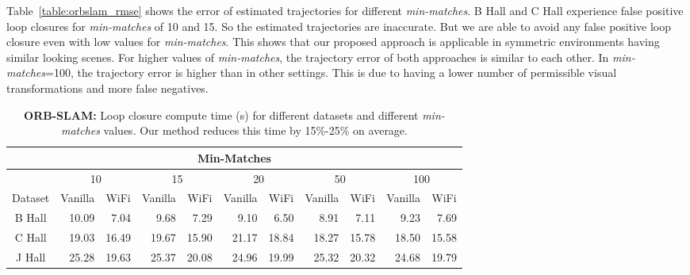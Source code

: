 Table~\ref{table:orbslam_rmse} shows the error of estimated trajectories for different {\it min-matches}. 
B Hall and C Hall experience false positive loop closures for {\it min-matches} of 10 and 15. 
So the estimated trajectories are inaccurate.
But we are able to avoid any false positive loop closure even with low values for {\it min-matches}. 
This shows that our proposed approach is applicable in symmetric environments having similar looking scenes. 
For higher values of {\it min-matches}, the trajectory error of both approaches is similar to each other.
In {\it min-matches}=100, the trajectory error is higher than in other settings. This is due to having a lower number of permissible visual transformations and more false negatives.
\begin{table}
\caption{{\bf ORB-SLAM:} Loop closure compute time (s) for different datasets and different {\it min-matches} values. Our method reduces this time by 15\%-25\% on average. }
\begin{center}
\begin{tabular}{| c | r r | r r | r r | r r | r r |} 
\hline 
\multicolumn{11}{|c|}{{Min-Matches}} \\ 
\hline 
 & \multicolumn{2}{|c|}{10} & \multicolumn{2}{|c|}{15} & \multicolumn{2}{|c|}{20} & \multicolumn{2}{|c|}{50} & \multicolumn{2}{|c|}{100} \\ 
\hline 
 {Dataset} & \multicolumn{1}{|c|}{Vanilla} & \multicolumn{1}{|c|}{WiFi} & \multicolumn{1}{|c|}{Vanilla} & \multicolumn{1}{|c|}{WiFi} & \multicolumn{1}{|c|}{Vanilla} & \multicolumn{1}{|c|}{WiFi} & \multicolumn{1}{|c|}{Vanilla} & \multicolumn{1}{|c|}{WiFi} & \multicolumn{1}{|c|}{Vanilla} & \multicolumn{1}{|c|}{WiFi} \\ 
\hline 
 B Hall & 10.09 & 7.04 & 9.68 & 7.29 & 9.10 & 6.50 & 8.91 & 7.11 & 9.23 & 7.69 \\ 
 C Hall & 19.03 & 16.49 & 19.67 & 15.90 & 21.17 & 18.84 & 18.27 & 15.78 & 18.50 & 15.58 \\ 
 J Hall & 25.28 & 19.63 & 25.37 & 20.08 & 24.96 & 19.99 & 25.32 & 20.32 & 24.68 & 19.79 \\ 
\hline 
\end{tabular}  
\label{table:orbslam_bounding}
\end{center}
\end{table}

